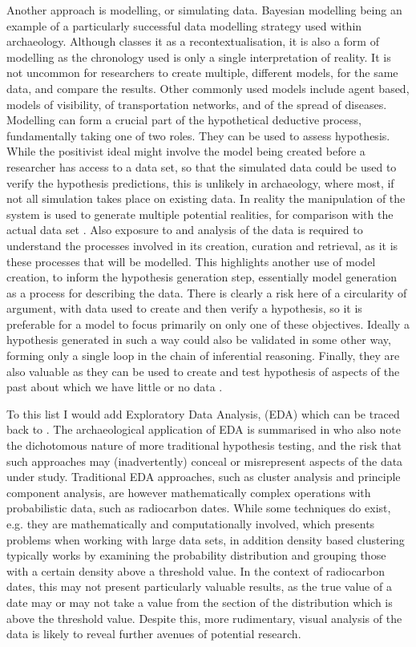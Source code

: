 Another approach is modelling, or simulating data. Bayesian modelling being an example of a particularly successful data modelling strategy used within archaeology. Although \citet{doi:10.1177/0162243916671200} classes it as a recontextualisation, it is also a form of modelling as the chronology used is only a single interpretation of reality. It is not uncommon for researchers to create multiple, different models, for the same data, and compare the results. Other commonly used models include agent based, models of visibility, of transportation networks, and of the spread of diseases. Modelling can form a crucial part of the hypothetical deductive process, fundamentally taking one of two roles. They can be used to assess hypothesis. While the positivist ideal might involve the model being created before a researcher has access to a data set, so that the simulated data could be used to verify the hypothesis predictions, this is unlikely in archaeology, where most, if not all simulation takes place on existing data. In reality the manipulation of the system is used to generate multiple potential realities, for comparison with the actual data set \citep[219]{doi:10.1177/0162243916671200}. Also exposure to and analysis of the data is required to understand the processes involved in its creation, curation and retrieval, as it is these processes that will be modelled. This highlights another use of model creation, to inform the hypothesis generation step, essentially model generation as a process for describing the data. There is clearly a risk here of a circularity of argument, with data used to create and then verify a hypothesis, so it is preferable for a model to focus primarily on only one of these objectives. Ideally a hypothesis generated in such a way could also be validated in some other way, forming only a single loop in the chain of inferential reasoning. Finally, they are also valuable as they can be used to create and test hypothesis of aspects of the past about which we have little or no data \citep[207]{doi:10.1177/0162243916671200}. 

To this list I would add Exploratory Data Analysis, (EDA) which can be traced back to \citet{tukey1962}. The archaeological application of EDA is summarised in \citet[128]{Wheatley:2002ly} who also note the dichotomous nature of more traditional hypothesis testing, and the risk that such approaches may (inadvertently) conceal or misrepresent aspects of the data under study.  Traditional EDA approaches, such as cluster analysis and principle component analysis, are however mathematically complex operations with probabilistic data, such as radiocarbon dates. While some techniques do exist, e.g. \cite{ERDEM:2014fk} they are mathematically and computationally involved, which presents problems when working with large data sets, in addition density based clustering typically works by examining the probability distribution and grouping those with a certain density above a threshold value. In the context of radiocarbon dates, this may not present particularly valuable results, as the true value of a date may or may not take a value from the section of the distribution which is above the threshold value. Despite this, more rudimentary, visual analysis of the data is likely to reveal further avenues of potential research.

